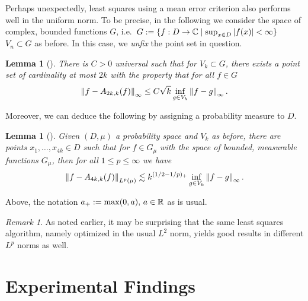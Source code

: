 \documentclass[12pt, oneside]{amsart}
\newtheorem{lem}[thm]{Lemma}
\theoremstyle{definition}
\theoremstyle{remark}
\newtheorem{remark}[thm]{Remark}
\numberwithin{equation}{section}
\begin{document}
Perhaps unexpectedly, least squares using a mean error criterion also performs well in the uniform norm. To be precise, in the following we consider the space of complex, bounded functions \(G\), i.e.\ \(G \defn \set{f: D \to \C \mid \sup_{x \in D} \abs{f(x)} < \infty}\) \(V_n \subset G\) as before. In this case, we \emph{unfix} the point set in question.

\begin{lem}[\cite{krieg2024samplingprojectionsuniformnorm}]
	There is \(C > 0\) universal such that for \(V_k \subset G\), there exists a point set of cardinality at most \(2k\) with the property that for all \(f \in G\) \[
		\norm[\infty]{f - A_{2k, k} (f)} \leq C \sqrt{k} \inf_{g \in V_k} \norm[\infty]{f-g}.
	\]
\end{lem}
Moreover, we can deduce the following by assigning a probability measure to \(D\).
\begin{lem}[\cite{krieg2024samplingprojectionsuniformnorm}]
	Given \((D, \mu)\) a probability space and \(V_k\) as before, there are points \(x_1, \dots, x_{4k} \in D\) such that for \(f \in G_\mu\) with the space of bounded, measurable functions \(G_\mu\), then for all \(1 \leq p \leq \infty\) we have \[
		\norm[L^p(\mu)]{f - A_{4k, k}(f)} \lesssim k^{(1/2-1/p)_+} \inf_{g \in V_k} \norm[\infty]{f-g}.
	\]
\end{lem}
Above, the notation \(a_+ \defn \max(0, a),\, a \in \R\) as is usual.
\begin{remark}
	As noted earlier, it may be surprising that the same least squares algorithm, namely optimized in the usual \(L^2\) norm, yields good results in different \(L^p\) norms as well.
\end{remark}

\section{Experimental Findings}\label{sec:experimentalFindings}

\end{document}
